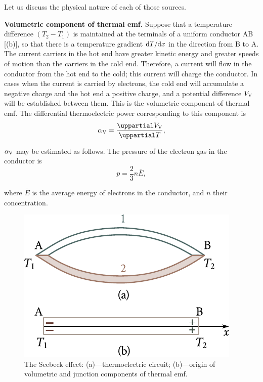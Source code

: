 Let us discuss the physical nature of each of those sources.

\textbf{Volumetric component of thermal emf.} Suppose that a temperature difference $(T_2 - T_1)$ is maintained at the terminals of a uniform conductor AB [(b)], so that there is a temperature gradient $\mathrm{d} T/\mathrm{d} x$ in the direction from B to A. The current carriers in the hot end have greater kinetic energy and greater speeds of motion than the carriers in the cold end. Therefore, a current will flow in the conductor from the hot end to the cold; this current will charge the conductor. In cases when the current is carried by electrons, the cold end will accumulate a negative charge and the hot end a positive charge, and a potential difference $V_{\text{V}}$ will be established between them. This is the volumetric component of thermal emf. The differential thermoelectric power corresponding to this component is
\begin{equation}\label{eq:9_3}
    \ab{\alpha}{V} = \diffpartial{\ab{V}{V}}{T},
\end{equation}

\noindent
$\alpha_{\text{V}}$ may be estimated as follows. The pressure of the electron gas in the conductor is
\begin{equation}\label{eq:9_4}
    p = \frac{2}{3} n \overline{E},
\end{equation}

\noindent
where $\overline{E}$ is the average energy of electrons in the conductor, and $n$ their concentration.

\begin{figure}[t]
	\begin{center}
		\includegraphics[scale=0.9]{figures/ch_09/fig_9_1.pdf}
		\caption[]{The Seebeck effect: (a)---thermoelectric circuit; (b)---origin of volumetric and junction components of thermal emf.}
		\label{fig:9_1}
	\end{center}
	\vspace{-0.9cm}
\end{figure}

